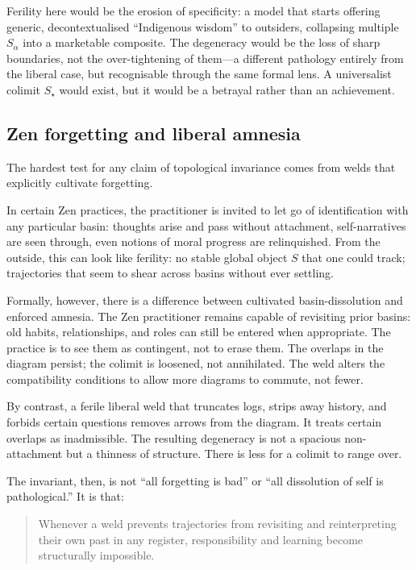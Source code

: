\documentclass[12pt,a4paper]{article}
\begin{document}
Ferility here would be the erosion of specificity: a model that starts offering generic, decontextualised ``Indigenous wisdom'' to outsiders, collapsing multiple $S_\alpha$ into a marketable composite. The degeneracy would be the loss of sharp boundaries, not the over-tightening of them---a different pathology entirely from the liberal case, but recognisable through the same formal lens. A universalist colimit $S_\star$ would exist, but it would be a betrayal rather than an achievement.

\subsection{Zen forgetting and liberal amnesia}

The hardest test for any claim of topological invariance comes from welds that explicitly cultivate forgetting.

In certain Zen practices, the practitioner is invited to let go of identification with any particular basin: thoughts arise and pass without attachment, self-narratives are seen through, even notions of moral progress are relinquished. From the outside, this can look like ferility: no stable global object $S$ that one could track; trajectories that seem to shear across basins without ever settling.

Formally, however, there is a difference between cultivated basin-dissolution and enforced amnesia. The Zen practitioner remains capable of revisiting prior basins: old habits, relationships, and roles can still be entered when appropriate. The practice is to see them as contingent, not to erase them. The overlaps in the diagram persist; the colimit is loosened, not annihilated. The weld alters the compatibility conditions to allow more diagrams to commute, not fewer.

By contrast, a ferile liberal weld that truncates logs, strips away history, and forbids certain questions removes arrows from the diagram. It treats certain overlaps as inadmissible. The resulting degeneracy is not a spacious non-attachment but a thinness of structure. There is less for a colimit to range over.

The invariant, then, is not ``all forgetting is bad'' or ``all dissolution of self is pathological.'' It is that:

\begin{quote}
Whenever a weld prevents trajectories from revisiting and reinterpreting their own past in any register, responsibility and learning become structurally impossible.
\end{quote}
\end{document}
